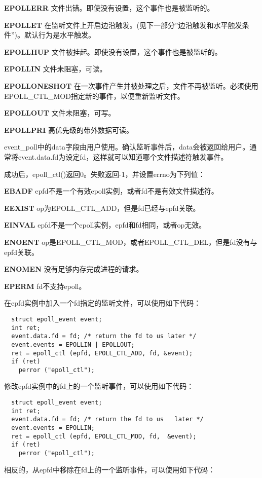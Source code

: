 \begin{eqlist*}
\item[\textbf{EPOLLERR}] 文件出错。即使没有设置，这个事件也是被监听的。
\item[\textbf{EPOLLET}] 在监听文件上开启边沿触发。(见下一部分''边沿触发和水平触发条件'')。默认行为是水平触发。
\item[\textbf{EPOLLHUP}] 文件被挂起。即使没有设置，这个事件也是被监听的。
\item[\textbf{EPOLLIN}] 文件未阻塞，可读。
\item[\textbf{EPOLLONESHOT}] 在一次事件产生并被处理之后，文件不再被监听。必须使用EPOLL\_CTL\_MOD指定新的事件，以便重新监听文件。
\item[\textbf{EPOLLOUT}] 文件未阻塞，可写。
\item[\textbf{EPOLLPRI}] 高优先级的带外数据可读。
\end{eqlist*}

event\_poll中的data字段由用户使用。确认监听事件后，data会被返回给用户。通常将event.data.fd为设定fd，这样就可以知道哪个文件描述符触发事件。

成功后，epoll\_ctl()返回0。失败返回-1，并设置errno为下列值：

\begin{eqlist*}
\item[\textbf{EBADF}] epfd不是一个有效epoll实例，或者fd不是有效文件描述符。
\item[\textbf{EEXIST}] op为EPOLL\_CTL\_ADD，但是fd已经与epfd关联。
\item[\textbf{EINVAL}] epfd不是一个epoll实例，epfd和fd相同，或者op无效。
\item[\textbf{ENOENT}] op是EPOLL\_CTL\_MOD，或者EPOLL\_CTL\_DEL，但是fd没有与epfd关联。
\item[\textbf{ENOMEN}] 没有足够内存完成进程的请求。
\item[\textbf{EPERM}] fd不支持epoll。
\end{eqlist*}

在epfd实例中加入一个fd指定的监听文件，可以使用如下代码：

\begin{lstlisting}
  struct epoll_event event;
  int ret;
  event.data.fd = fd; /* return the fd to us later */
  event.events = EPOLLIN | EPOLLOUT;
  ret = epoll_ctl (epfd, EPOLL_CTL_ADD, fd, &event);
  if (ret)
    perror ("epoll_ctl");
\end{lstlisting}

修改epfd实例中的fd上的一个监听事件，可以使用如下代码：

\begin{lstlisting}
  struct epoll_event event;
  int ret;
  event.data.fd = fd; /* return the fd to us   later */
  event.events = EPOLLIN;
  ret = epoll_ctl (epfd, EPOLL_CTL_MOD, fd,  &event);
  if (ret)
    perror ("epoll_ctl");
\end{lstlisting}
相反的，从epfd中移除在fd上的一个监听事件，可以使用如下代码：

